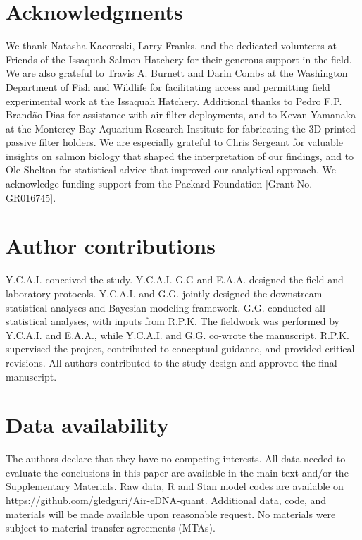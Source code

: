\documentclass{article}
\begin{document}
\section*{Acknowledgments}
We thank Natasha Kacoroski, Larry Franks, and the dedicated volunteers at Friends of the Issaquah Salmon Hatchery for their generous support in the field. We are also grateful to Travis A. Burnett and Darin Combs at the Washington Department of Fish and Wildlife for facilitating access and permitting field experimental work at the Issaquah Hatchery. Additional thanks to Pedro F.P. Brandão-Dias for assistance with air filter deployments, and to Kevan Yamanaka at the Monterey Bay Aquarium Research Institute for fabricating the 3D-printed passive filter holders. We are especially grateful to Chris Sergeant for valuable insights on salmon biology that shaped the interpretation of our findings, and to Ole Shelton for statistical advice that improved our analytical approach. We acknowledge funding support from the Packard Foundation [Grant No. GR016745].

\section*{Author contributions}
Y.C.A.I. conceived the study. Y.C.A.I. G.G and E.A.A. designed the field and laboratory protocols. Y.C.A.I. and G.G. jointly designed the downstream statistical analyses and Bayesian modeling framework. G.G. conducted all statistical analyses, with inputs from R.P.K. The fieldwork was performed by Y.C.A.I. and E.A.A., while Y.C.A.I. and G.G. co-wrote the manuscript. R.P.K. supervised the project, contributed to conceptual guidance, and provided critical revisions. All authors contributed to the study design and approved the final manuscript.  

\section*{Data availability}
The authors declare that they have no competing interests. All data needed to evaluate the conclusions in this paper are available in the main text and/or the Supplementary Materials. Raw data, R and Stan model codes are available on https://github.com/gledguri/Air-eDNA-quant. Additional data, code, and materials will be made available upon reasonable request. No materials were subject to material transfer agreements (MTAs).

\clearpage

\end{document}
